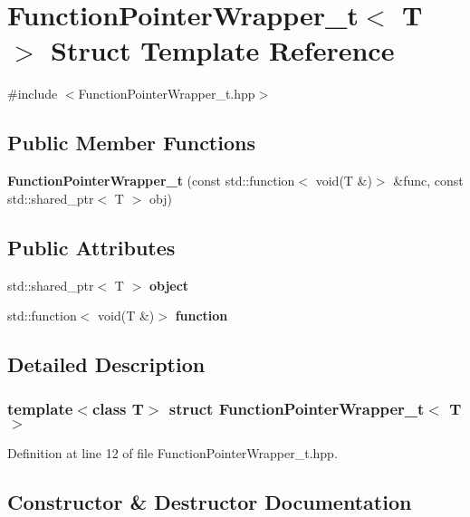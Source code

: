 \section{Function\+Pointer\+Wrapper\+\_\+t$<$ T $>$ Struct Template Reference}
\label{struct_function_pointer_wrapper__t}


{\ttfamily \#include $<$Function\+Pointer\+Wrapper\+\_\+t.\+hpp$>$}

\subsection*{Public Member Functions}
\begin{DoxyCompactItemize}
\item 
\textbf{ Function\+Pointer\+Wrapper\+\_\+t} (const std\+::function$<$ void(T \&)$>$ \&func, const std\+::shared\+\_\+ptr$<$ T $>$ obj)
\end{DoxyCompactItemize}
\subsection*{Public Attributes}
\begin{DoxyCompactItemize}
\item 
std\+::shared\+\_\+ptr$<$ T $>$ \textbf{ object}
\item 
std\+::function$<$ void(T \&)$>$ \textbf{ function}
\end{DoxyCompactItemize}


\subsection{Detailed Description}
\subsubsection*{template$<$class T$>$\newline
struct Function\+Pointer\+Wrapper\+\_\+t$<$ T $>$}



Definition at line 12 of file Function\+Pointer\+Wrapper\+\_\+t.\+hpp.



\subsection{Constructor \& Destructor Documentation}
\mbox{\label{struct_function_pointer_wrapper__t_a0e732b147c9ee3ff00bd0f503d5870a3}} 

